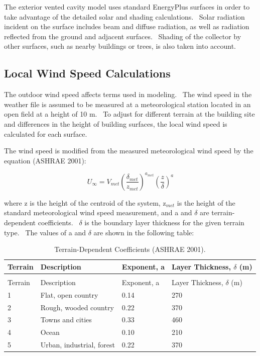 The exterior vented cavity model uses standard EnergyPlus surfaces in order to take advantage of the detailed solar and shading calculations.~ Solar radiation incident on the surface includes beam and diffuse radiation, as well as radiation reflected from the ground and adjacent surfaces.~ Shading of the collector by other surfaces, such as nearby buildings or trees, is also taken into account.

\subsection{Local Wind Speed Calculations}\label{local-wind-speed-calculations}

The outdoor wind speed affects terms used in modeling.~ The wind speed in the weather file is assumed to be measured at a meteorological station located in an open field at a height of 10 m.~ To adjust for different terrain at the building site and differences in the height of building surfaces, the local wind speed is calculated for each surface.

The wind speed is modified from the measured meteorological wind speed by the equation (ASHRAE 2001):

\begin{equation}
{U_\infty } = {V_{met}}{\left( {\frac{{{\delta_{met}}}}{{{z_{met}}}}} \right)^{{a_{met}}}}{\left( {\frac{z}{\delta }} \right)^a}
\end{equation}

where z is the height of the centroid of the system, z\(_{met}\) is the height of the standard meteorological wind speed measurement, and a and $\delta$ are terrain-dependent coefficients.~ $\delta$ is the boundary layer thickness for the given terrain type.~ The values of a and $\delta$ are shown in the following table:

\begin{longtable}[c]{@{}llll@{}}
\caption{Terrain-Dependent Coefficients (ASHRAE 2001). \label{table:terrain-dependent-coefficients-ashrae-2001.}} \tabularnewline
\toprule
Terrain & Description & Exponent, a & Layer Thickness, $\delta$ (m) \tabularnewline
\midrule
\endfirsthead

\caption[]{Terrain-Dependent Coefficients (ASHRAE 2001).} \tabularnewline
\toprule
Terrain & Description & Exponent, a & Layer Thickness, $\delta$ (m) \tabularnewline
\midrule
\endhead

1 & Flat, open country & 0.14 & 270 \tabularnewline
2 & Rough, wooded country & 0.22 & 370 \tabularnewline
3 & Towns and cities & 0.33 & 460 \tabularnewline
4 & Ocean & 0.10 & 210 \tabularnewline
5 & Urban, industrial, forest & 0.22 & 370 \tabularnewline
\bottomrule
\end{longtable}

